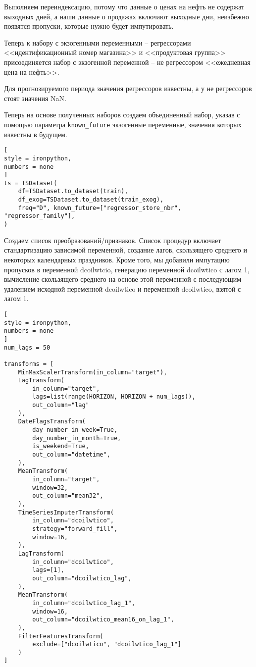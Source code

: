 \documentclass[%
	11pt,
	a4paper,
	utf8,
		]{article}
\begin{document}
Выполняем переиндексацию, потому что данные о ценах на нефть не содержат выходных дней, а наши данные о продажах включают выходные дни, неизбежно появятся пропуски, которые нужно будет импутировать. 

Теперь к набору с экзогенными переменными -- регрессорами <<идентификационный номер магазина>> и <<продуктовая группа>> присоединяется набор с экзогенной переменной -- не регрессором <<ежедневная цена на нефть>>.

Для прогнозируемого периода значения регрессоров известны, а у не регрессоров стоят значения NaN.

Теперь на основе полученных наборов создаем объединенный набор, указав с помощью параметра \verb|known_future| экзогенные переменные, значения которых известны в будущем.
\begin{lstlisting}[
style = ironpython,
numbers = none
]
ts = TSDataset(
    df=TSDataset.to_dataset(train),
    df_exog=TSDataset.to_dataset(train_exog),
    freq="D", known_future=["regressor_store_nbr", "regressor_family"],
)
\end{lstlisting}

Создаем список преобразований/признаков. Список процедур включает стандартизацию зависимой переменной, создание лагов, скользящего среднего и некоторых календарных праздников. Кроме того, мы добавили импутацию пропусков в переменной dcoilwtcio, генерацию переменной dcoilwtico с лагом 1, вычисление скользящего среднего на основе этой переменной с последующим удалением исходной переменной dcoilwtico и переменной dcoilwtico, взятой с лагом 1.
\begin{lstlisting}[
style = ironpython,
numbers = none
]
num_lags = 50

transforms = [
    MinMaxScalerTransform(in_column="target"),
    LagTransform(
        in_column="target",
        lags=list(range(HORIZON, HORIZON + num_lags)),
        out_column="lag"
    ),
    DateFlagsTransform(
        day_number_in_week=True,
        day_number_in_month=True,
        is_weekend=True,
        out_column="datetime",
    ),
    MeanTransform(
        in_column="target",
        window=32,
        out_column="mean32",
    ),
    TimeSeriesImputerTransform(
        in_column="dcoilwtico",
        strategy="forward_fill",
        window=16,
    ),
    LagTransform(
        in_column="dcoilwtico",
        lags=[1],
        out_column="dcoilwtico_lag",
    ),
    MeanTransform(
        in_column="dcoilwtico_lag_1",
        window=16,
        out_column="dcoilwtico_mean16_on_lag_1",
    ),
    FilterFeaturesTransform(
        exclude=["dcoilwtico", "dcoilwtico_lag_1"]
    )
]
\end{lstlisting}
\end{document}
